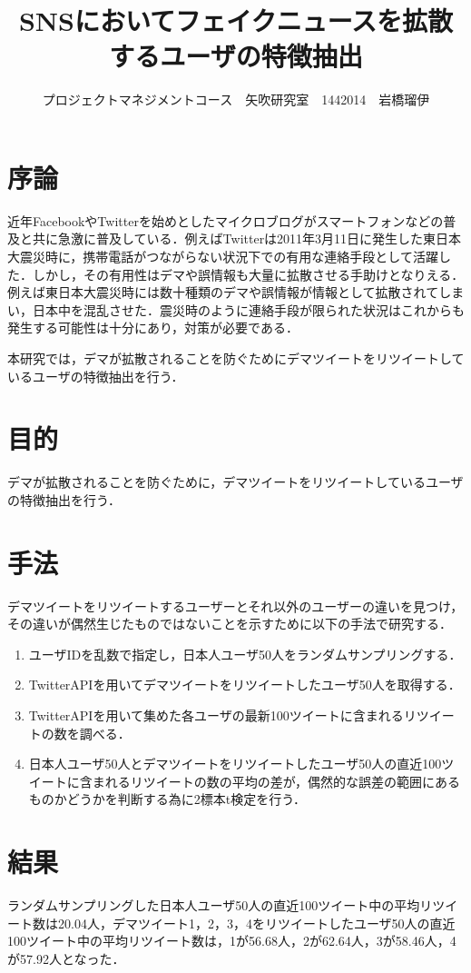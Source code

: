 \documentclass[uplatex,twocolumn,dvipdfmx]{jsarticle}
\title{\vspace{-5mm}\fontsize{14pt}{0pt}\selectfont SNSにおいてフェイクニュースを拡散するユーザの特徴抽出}
\author{\normalsize プロジェクトマネジメントコース　矢吹研究室　1442014　岩橋瑠伊}
\date{}
\begin{document}
\fontsize{10.5pt}{\baselineskip}\selectfont
\maketitle





\section{序論}
近年FacebookやTwitterを始めとしたマイクロブログがスマートフォンなどの普及と共に急激に普及している．例えばTwitterは2011年3月11日に発生した東日本大震災時に，携帯電話がつながらない状況下での有用な連絡手段として活躍した．しかし，その有用性はデマや誤情報も大量に拡散させる手助けとなりえる．例えば東日本大震災時には数十種類のデマや誤情報が情報として拡散されてしまい，日本中を混乱させた．震災時のように連絡手段が限られた状況はこれからも発生する可能性は十分にあり，対策が必要である\cite{dema1}．

本研究では，デマが拡散されることを防ぐためにデマツイートをリツイートしているユーザの特徴抽出を行う．

\section{目的}
デマが拡散されることを防ぐために，デマツイートをリツイートしているユーザの特徴抽出を行う．

\section{手法}
デマツイートをリツイートするユーザーとそれ以外のユーザーの違いを見つけ，その違いが偶然生じたものではないことを示すために以下の手法で研究する．
\begin{enumerate}
\item ユーザIDを乱数で指定し，日本人ユーザ50人をランダムサンプリングする．
\item TwitterAPIを用いてデマツイートをリツイートしたユーザ50人を取得する．
\item TwitterAPIを用いて集めた各ユーザの最新100ツイートに含まれるリツイートの数を調べる．
\item 日本人ユーザ50人とデマツイートをリツイートしたユーザ50人の直近100ツイートに含まれるリツイートの数の平均の差が，偶然的な誤差の範囲にあるものかどうかを判断する為に2標本t検定を行う．
\end{enumerate}

\section{結果}
ランダムサンプリングした日本人ユーザ50人の直近100ツイート中の平均リツイート数は20.04人，デマツイート1，2，3，4をリツイートしたユーザ50人の直近100ツイート中の平均リツイート数は，1が56.68人，2が62.64人，3が58.46人，4が57.92人となった．
\end{document}
